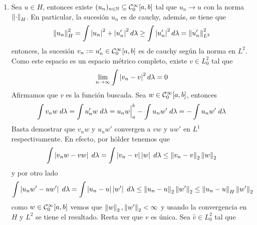 \documentclass{article}
\begin{document}
\begin{enumerate}
    \item Sea $u\in H$, entonces existe $(u_{n})_{n\in\mathbb{N}}\subseteq \mathcal{C}_{0}^{\infty}[a,b]$ tal que
    $u_{n}\to u$ con la norma $\left \lVert \cdot\right \rVert_{H}$. En particular, la sucesión $u_{n}$ es de cauchy,
    además, se tiene que
    \begin{equation*}
        \left \lVert u_{n}\right \rVert_{H}^{2}=\int\left|u_{n} \right|^{2}+\left|u_{n}' \right|^{2}d\lambda
        \geq\int\left|u_{n}' \right|^{2}d\lambda=\left \lVert u_{n}'\right \rVert_{L^{2}}^{2}
    \end{equation*}
    entonces, la sucesión $v_{n}:=u_{n}'\in\mathcal{C}_{0}^{\infty}[a,b]$ es de cauchy según la norma en 
    $L^{2}$. Como este espacio es un espacio métrico completo, existe $v\in L_{0}^{2}$ tal que
    \begin{equation*}
        \lim\limits_{n\to\infty}\int\left|v_{n}-v \right|^{2}d\lambda=0
    \end{equation*}
    Afirmamos que $v$ es la función buscada. Sea $w\in\mathcal{C}_{0}^{\infty}[a,b]$, entonces
    \begin{equation*}
        \int v_{n}w\hspace{1mm}d\lambda=\int u_{n}'w\hspace{1mm}d\lambda=u_{n}w\Big|_{a}^{b}
        -\int u_{n}w'\hspace{1mm}d\lambda=-\int u_{n}w'\hspace{1mm}d\lambda
    \end{equation*}
    Basta demostrar que $v_{n}w$ y $u_{n}w'$ convergen a $vw$ y $uw'$ en $L^{1}$ respectivamente.
    En efecto, por hölder tenemos que
    \begin{equation*}
        \int\left|v_{n}w-vw \right|\hspace{1mm}d\lambda=\int\left|v_{n}-v \right|\left|w \right|\hspace{1mm}d\lambda
        \leq\left \lVert v_{n}-v\right \rVert_{2}\left \lVert w\right \rVert_{2}
    \end{equation*}
    y por otro lado
    \begin{equation*}
        \int\left|u_{n}w'-uw' \right|\hspace{1mm}d\lambda=\int\left|u_{n}-u \right|\left|w' \right|\hspace{1mm}d\lambda
        \leq\left \lVert u_{n}-u\right \rVert_{2}\left \lVert w'\right \rVert_{2}\leq\left \lVert u_{n}-u\right \rVert_{H}\left \lVert w'\right \rVert_{2}
    \end{equation*}
    como $w\in\mathcal{C}_{0}^{\infty}[a,b]$ vemos que $\left \lVert w\right \rVert_{2},\left \lVert w'\right \rVert_{2}<\infty$ y usando la 
    convergencia en $H$ y $L^{2}$ se tiene el resultado. Resta ver que $v$ es única. Sea 
    $\widehat{v}\in L_{0}^{2}$ tal que
    \begin{equation*}

\end{equation*}
\end{enumerate}
\end{document}
